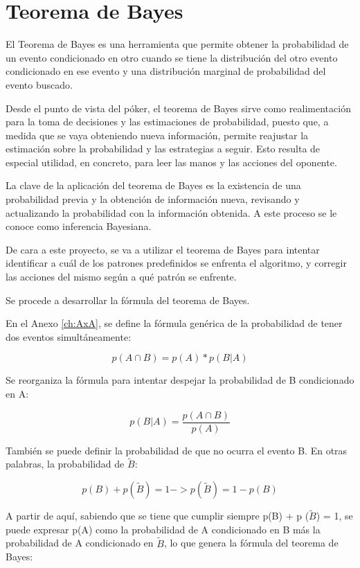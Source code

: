 \section{Teorema de Bayes}
\label{sec:bayes}

El Teorema de Bayes es una herramienta que permite obtener la probabilidad de un evento condicionado en otro cuando se tiene la distribución del otro evento condicionado en ese evento y una distribución marginal de probabilidad del evento buscado. \cite{chen}

Desde el punto de vista del póker, el teorema de Bayes sirve como realimentación para la toma de decisiones y las estimaciones de probabilidad, puesto que, a medida que se vaya obteniendo nueva información, permite reajustar la estimación sobre la probabilidad y las estrategias a seguir. Esto resulta de especial utilidad, en concreto, para leer las manos y las acciones del oponente. 

La clave de la aplicación del teorema de Bayes es la existencia de una probabilidad previa y la obtención de información nueva, revisando y actualizando la probabilidad con la información obtenida. A este proceso se le conoce como inferencia Bayesiana.

De cara a este proyecto, se va a utilizar el teorema de Bayes para intentar identificar a cuál de los patrones predefinidos se enfrenta el algoritmo, y corregir las acciones del mismo según a qué patrón se enfrente.

Se procede a desarrollar la fórmula del teorema de Bayes.\cite{chen}

En el Anexo \ref{ch:AxA}, se define la fórmula genérica de la probabilidad de tener dos eventos simultáneamente:


\[p(A\cap B)=p(A)*p(B | A)\]

Se reorganiza la fórmula para intentar despejar la probabilidad de B condicionado en A:

\[p(B|A)=\frac{p(A\cap B)}{p(A)}\]

También se puede definir la probabilidad de que no ocurra el evento B. En otras palabras, la probabilidad de $\tilde{B}$:

\[p(B) + p (\tilde{B}) = 1 -> p (\tilde{B}) = 1 - p(B)\]

A partir de aquí, sabiendo que se tiene que cumplir siempre p(B) + p ($\tilde{B}$) = 1, se puede expresar p(A) como la probabilidad de A condicionado en B más la probabilidad de A condicionado en $\tilde{B}$, lo que genera la fórmula del teorema de Bayes:


